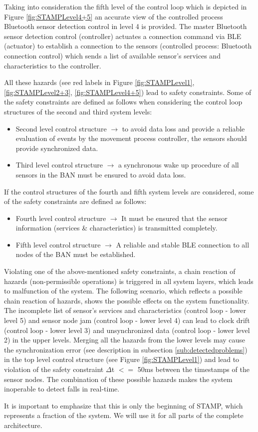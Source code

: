 \documentclass[review]{elsarticle}
\begin{document}
\begin{itemize}
    
	Taking into consideration the fifth level of the control loop which is depicted in Figure \ref{fig:STAMPLevel4+5} an accurate view of the controlled process Bluetooth sensor detection control in level 4 is provided. The master Bluetooth sensor detection control (controller) actuates a connection command via BLE (actuator) to establish a connection to the sensors (controlled process: Bluetooth connection control) which sends a list of available sensor's services and characteristics to the controller. 
	
	All these hazards (see red labels in Figure \ref{fig:STAMPLevel1}, \ref{fig:STAMPLevel2+3}, \ref{fig:STAMPLevel4+5}) lead to safety constraints.
	Some of the safety constraints are defined as follows when considering the control loop structures of the second and third system levels:
	\begin{itemize}
		\item Second level control structure $\rightarrow$ to avoid data loss and provide a reliable evaluation of events by the movement process controller, the sensors should provide synchronized data.
		\item Third level control structure $\rightarrow$ a synchronous wake up procedure of all sensors in the BAN must be ensured to avoid data loss.
	\end{itemize}
	If the control structures of the fourth and fifth system levels are considered, some of the safety constraints are defined as follows:
	\begin{itemize}
		\item Fourth level control structure $\rightarrow$ It must be ensured that the sensor information (services \& characteristics) is transmitted completely.
		\item Fifth level control structure $\rightarrow$ A reliable and stable BLE connection to all nodes of the BAN must be established.
	\end{itemize}
	Violating one of the above-mentioned safety constraints, a chain reaction of hazards (non-permissible operations) is triggered in all system layers, which leads to malfunction of the system.  The following scenario, which reflects a possible chain reaction of hazards, shows the possible effects on the system functionality.
	The incomplete list of sensor's services and characteristics (control loop - lower level 5) and sensor node jam (control loop - lower level 4) can lead to clock drift (control loop - lower level 3) and unsynchronized data (control loop - lower level 2) in the upper levels. Merging all the hazards from the lower levels may cause the synchronization error (see description in subsection \ref{sub:detectedproblems}) in the top level control structure (see Figure \ref{fig:STAMPLevel1}) and lead to violation of the safety constraint $\Delta$t $<=$ 50ms between the timestamps of the sensor nodes. The combination of these possible hazards makes the system inoperable to detect falls in real-time.
	
\end{itemize}
	It is important to emphasize that this is only the beginning of STAMP, which represents a fraction of the system.  We will use it for all parts of the complete architecture.
\end{document}
